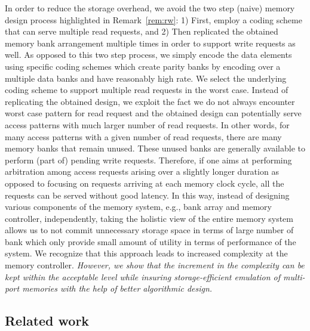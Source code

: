 In order to reduce the storage overhead, we avoid the two step (naive) memory design process highlighted in Remark~\ref{rem:rw}: 1) First, employ a coding scheme that can serve multiple read requests, and 2) Then replicated the obtained memory bank arrangement multiple times in order to support write requests as well. As opposed to this two step process, we simply encode the data elements using specific coding schemes which create parity banks by encoding over a multiple data banks and have reasonably high rate. We select the underlying coding scheme to support multiple read requests in the worst case. Instead of replicating the obtained design, we exploit the fact we do not always encounter worst case pattern for read request and the obtained design can potentially serve access patterns with much larger number of read requests. In other words, for many access patterns with a given number of read requests, there are many memory banks that remain unused. These unused banks are generally available to perform (part of) pending write requests. Therefore, if one aims at performing arbitration among access requests arising over a slightly longer duration as opposed to focusing on requests arriving at each memory clock cycle, all the requests can be served without good latency. In this way, instead of designing various components of the memory system, e.g., bank array and memory controller, independently, taking the holistic view of the entire memory system allows us to not commit unnecessary storage space in terms of large number of bank which only provide small amount of utility in terms of performance of the system. We recognize that this approach leads to increased complexity at the memory controller. {\color{red} {\em However, we show that the increment in the complexity can be kept within the acceptable level while insuring storage-efficient emulation of multi-port memories with the help of better algorithmic design.}}

\subsection{Related work}

